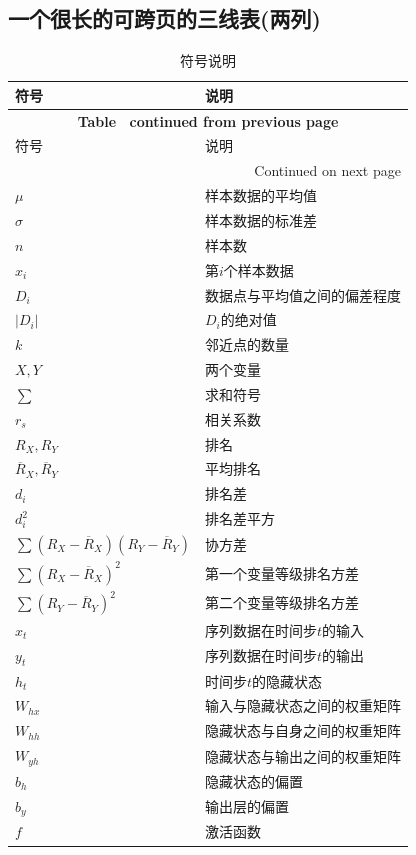 \documentclass[12pt, a4paper, oneside]{ctexart}
\begin{document}
\subsection{一个很长的可跨页的三线表(两列)}
	\begin{longtable}[c]{@{}ll@{}}
		\caption{符号说明}\label{tab:symbols}\\		%
		\toprule
		符号    & 说明  \\							%
		\midrule
		\endfirsthead
		\multicolumn{2}{c}{{\bfseries Table \thetable\ continued from previous page}} \\
		\toprule
		符号    & 说明 \\
		\midrule
		\endhead
		\midrule
		\multicolumn{2}{r}{{Continued on next page}} \\ \bottomrule
		\endfoot
		\bottomrule
		\endlastfoot
		$\mu$  & 样本数据的平均值 \\
		$\sigma$ & 样本数据的标准差 \\
		$n$     & 样本数   \\
		$x_i$ & 第$i$个样本数据 \\
		$D_i$  & 数据点与平均值之间的偏差程度 \\
		$|D_i|$ & $D_i$的绝对值 \\
		$k$   & 邻近点的数量 \\
		$X,Y$   & 两个变量  \\
		$\sum$ & 求和符号 \\
		$r_s$   & 相关系数 \\
		$R_X,R_Y$ & 排名 \\
		$\overline R_X, \overline R_Y$ & 平均排名 \\
		$d_i$   & 排名差 \\
		$d_i^2$ & 排名差平方 \\
		$\sum(R_X-\overline R_X)(R_Y-\overline R_Y)$ & 协方差 \\
		$\sum(R_X-\overline R_X)^2$ & 第一个变量等级排名方差 \\
		$\sum(R_Y-\overline R_Y)^2$ & 第二个变量等级排名方差 \\
		$x_t$ & 序列数据在时间步$t$的输入 \\
		$y_t$ & 序列数据在时间步$t$的输出 \\
		$h_t$ & 时间步$t$的隐藏状态 \\
		$W_{hx}$ & 输入与隐藏状态之间的权重矩阵 \\
		$W_{hh}$ & 隐藏状态与自身之间的权重矩阵 \\
		$W_{yh}$ & 隐藏状态与输出之间的权重矩阵 \\
		$b_h$ & 隐藏状态的偏置 \\
		$b_y$ & 输出层的偏置 \\
		$f$ & 激活函数 \\
	\end{longtable}
	
\end{document}
